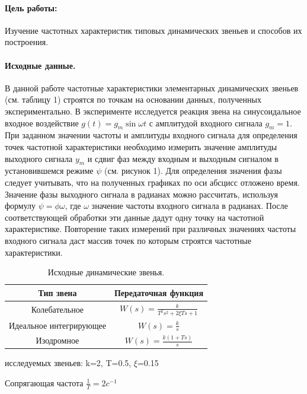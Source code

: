 \documentclass[12pt,a4paper]{article}
\begin{document}


\paragraph{Цель работы:}Изучение частотных характеристик типовых динамических звеньев и способов их построения.%
\paragraph{Исходные данные.}
В данной работе частотные характеристики элементарных динамических звеньев (см. таблицу 1) строятся по точкам на основании данных, полученных экспериментально. В эксперименте исследуется реакция звена на синусоидальное входное воздействие $g(t) = g_m\sin{\omega t}$ с амплитудой входного сигнала $g_m=1$. При заданном значении частоты и амплитуды входного сигнала для определения точек частотной характеристики необходимо измерить значение амплитуды выходного сигнала $y_m$ и сдвиг фаз между входным и выходным сигналом в установившемся режиме $\psi$ (см. рисунок 1). Для определения значения фазы следует учитывать, что на полученных графиках по оси абсцисс отложено время. Значение фазы выходного сигнала в радианах можно рассчитать, используя формулу $\psi=\phi\omega$, где $\omega$ значение частоты входного сигнала в радианах. После соответствующей обработки эти данные дадут одну точку на частотной характеристике. Повторение таких измерений при различных значениях частоты входного сигнала даст массив точек по которым строятся частотные характеристики.
\begin{table}[h!]
	\renewcommand{\arraystretch}{1.8} %
	\centering
	\begin{threeparttable}
	\caption{Исходные динамические звенья.}
	\begin{tabular}{|c|c|}
		\hline Тип звена & Передаточная функция\\
		\hline Колебательное & $W(s) = \displaystyle{\frac{k}{T^2s^2 + 2\xi Ts + 1}}$ \\
		\hline Идеальное интегрирующее & $W(s) = \displaystyle{\frac{k}{s}}$ \\
		\hline Изодромное & $W(s) = \displaystyle{\frac{k(1 + Ts)}{s}}$ \\
		\hline
	\end{tabular}
	\end{threeparttable}
\end{table} 
 исследуемых звеньев: k=2, T=0.5, $\xi$=0.15\par
Сопрягающая частота $\frac{1}{T}=2c^{-1}$
\end{document}
